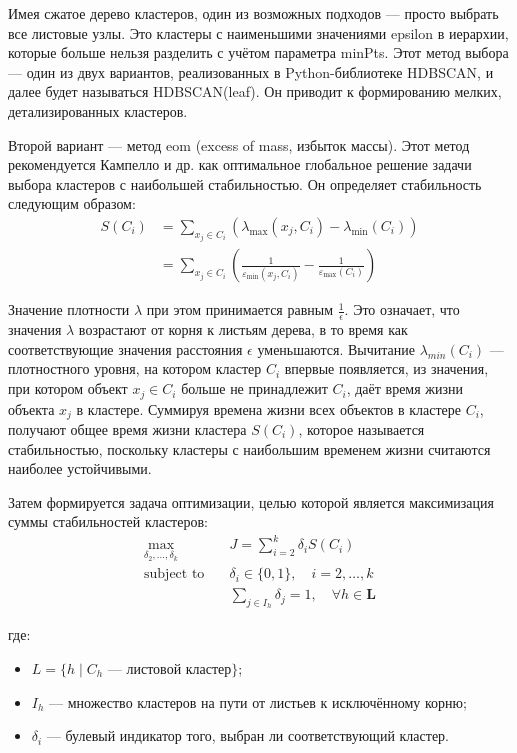 Имея сжатое дерево кластеров, один из возможных подходов — просто выбрать все листовые узлы. Это кластеры с наименьшими значениями epsilon в иерархии, которые больше нельзя разделить с учётом параметра minPts. Этот метод выбора — один из двух вариантов, реализованных в Python-библиотеке HDBSCAN, и далее будет называться HDBSCAN(leaf). Он приводит к формированию мелких, детализированных кластеров.

Второй вариант — метод eom (excess of mass, избыток массы). Этот метод рекомендуется Кампелло и др. как оптимальное глобальное решение задачи выбора кластеров с наибольшей стабильностью. Он определяет стабильность следующим образом:
\begin{equation}
\begin{aligned}
S(C_i) &= \sum_{x_j \in C_i} \left( \lambda_{\max}(x_j, C_i) - \lambda_{\min}(C_i) \right) \\
       &= \sum_{x_j \in C_i} \left( \frac{1}{\varepsilon_{\min}(x_j, C_i)} - \frac{1}{\varepsilon_{\max}(C_i)} \right)
\end{aligned}
\end{equation}


Значение плотности $\lambda$ при этом принимается равным $\frac{1}{\epsilon}$. Это означает, что значения $\lambda$ возрастают от корня к листьям дерева, в то время как соответствующие значения расстояния $\epsilon$ уменьшаются. Вычитание $\lambda_{min}(C_i)$ — плотностного уровня, на котором кластер $C_i$ впервые появляется, из значения, при котором объект $x_j ∈ C_i$ больше не принадлежит $C_i$, даёт время жизни объекта $x_j$ в кластере. Суммируя времена жизни всех объектов в кластере $C_i$, получают общее время жизни кластера $S(C_i)$, которое называется стабильностью, поскольку кластеры с наибольшим временем жизни считаются наиболее устойчивыми.

Затем формируется задача оптимизации, целью которой является максимизация суммы стабильностей кластеров:
\begin{equation}
\begin{aligned}
\max_{\delta_2, \ldots, \delta_k} \quad & J = \sum_{i=2}^{k} \delta_i S(C_i) \\
\text{subject to} \quad & \delta_i \in \{0,1\}, \quad i = 2, \ldots, k \\
& \sum_{j \in I_h} \delta_j = 1, \quad \forall h \in \mathbf{L}
\end{aligned}
\end{equation}


где:
\begin{itemize}
    \item $L = \{h \mid C_h \text{ — листовой кластер}\}$;
    \item $I_h$ — множество кластеров на пути от листьев к исключённому корню;
    \item $\delta_i$ — булевый индикатор того, выбран ли соответствующий кластер.
\end{itemize}

